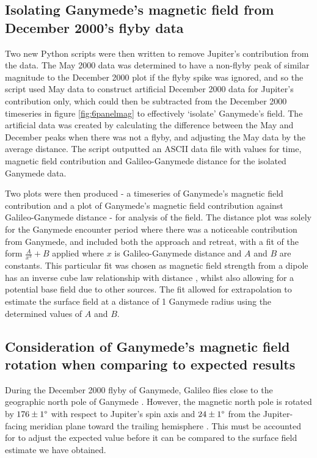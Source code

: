 \documentclass[11pt]{article}
\begin{document}
\subsection{Isolating Ganymede's magnetic field from December 2000's flyby data}

Two new Python scripts were then written to remove Jupiter's contribution from the data. The May 2000 data was determined to have a non-flyby peak of similar magnitude to the December 2000 plot if the flyby spike was ignored, and so the script used May data to construct artificial December 2000 data for Jupiter's contribution only, which could then be subtracted from the December 2000 timeseries in figure \ref{fig:6panelmag} to effectively `isolate' Ganymede's field. The artificial data was created by calculating the difference between the May and December peaks when there was not a flyby, and adjusting the May data by the average distance. The script outputted an ASCII data file with values for time, magnetic field contribution and Galileo-Ganymede distance for the isolated Ganymede data.

Two plots were then produced - a timeseries of Ganymede's magnetic field contribution and a plot of Ganymede's magnetic field contribution against Galileo-Ganymede distance - for analysis of the field. The distance plot was solely for the Ganymede encounter period where there was a noticeable contribution from Ganymede, and included both the approach and retreat, with a fit of the form $\frac{A}{x^{3}} + B$ applied where $x$ is Galileo-Ganymede distance and $A$ and $B$ are constants. This particular fit was chosen as magnetic field strength from a dipole has an inverse cube law relationship with distance \cite{inversecube}, whilst also allowing for a potential base field due to other sources. The fit allowed for extrapolation to estimate the surface field at a distance of 1 Ganymede radius using the determined values of $A$ and $B$.

\subsection{Consideration of Ganymede's magnetic field rotation when comparing to expected results}

During the December 2000 flyby of Ganymede, Galileo flies close to the geographic north pole of Ganymede \cite{flybylines}. However, the magnetic north pole is rotated by $176 \pm 1\degree$ with respect to Jupiter's spin axis and $24 \pm 1\degree$ from the Jupiter-facing meridian plane toward the trailing hemisphere \cite{magrotation}. This must be accounted for to adjust the expected value before it can be compared to the surface field estimate we have obtained.
\end{document}
